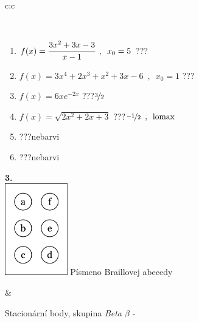 \documentclass[10pt]{report}
\begin{document}
\begin{tabular}{c:c}
\begin{minipage}[c][104.5mm][t]{0.5\linewidth}
\begin{center}
\begin{minipage}{0.95\linewidth}
\begin{center}
\end{center}
\end{minipage}
\\[1mm]
\begin{minipage}{0.79\linewidth}
\begin{center}
\begin{varwidth}{\linewidth}
\begin{enumerate}
\normalsize
\item $f(x)=\cfrac{3x^2+3x-3}{x-1}\enspace , \enspace x_0=5$\quad \dotfill\; ???\;\dotfill \quad {}
\item $f(x)=3x^4+2x^3+x^2+3x-6\enspace , \enspace x_0=1$\quad \dotfill\; ???\;\dotfill \quad {}
\item $f(x)=6xe^{-2x}$\quad \dotfill\; ???\;\dotfill \quad $\nicefrac{3}{2}$
\item $f(x)=\sqrt{2x^2+2x+3}$\quad \dotfill\; ???\;\dotfill \quad $\nicefrac{-1}{2}\enspace , \enspace\mathrm{lomax}$
\item \quad \dotfill\; ???\;\dotfill \quad nebarvi
\item \quad \dotfill\; ???\;\dotfill \quad nebarvi
\end{enumerate}
\end{varwidth}
\end{center}
\end{minipage}
\begin{minipage}{0.20\linewidth}
\begin{center}
{\Huge\bfseries 3.} \\[2mm]
\includegraphics[height=40mm]{../images/braille.png}
{\small Písmeno Braillovej abecedy}
\end{center}
\end{minipage}
\end{center}
\end{minipage}
&
\begin{minipage}[c][104.5mm][t]{0.5\linewidth}
\begin{center}
\vspace{7mm}
{\huge Stacionární body, skupina \textit{Beta $\beta$} -}\\[5mm]

\end{center}
\end{minipage}
\end{tabular}
\end{document}
